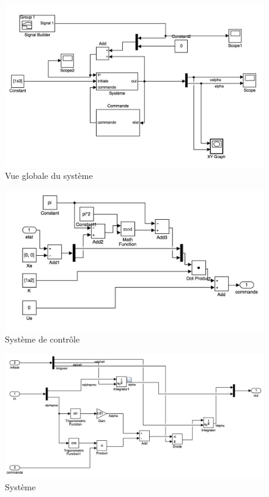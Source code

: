 \documentclass[11pt]{article}
\begin{document}
\begin{figure}[H]
	\includegraphics[scale=0.2]{images/pendule_inverse_1}
	\caption{Vue globale du système}
\end{figure}
\begin{figure}[H]
	\includegraphics[scale=0.2]{images/pendule_inverse_2}
	\caption{Système de contrôle}
\end{figure}
\begin{figure}[H]
	\includegraphics[scale=0.2]{images/pendule_inverse_3}
	\caption{Système}
\end{figure}
\end{document}
